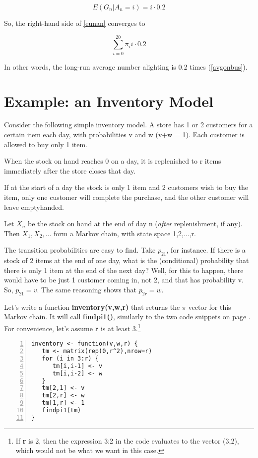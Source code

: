 \begin{equation}
E(G_n | A_n = i) = i \cdot 0.2
\end{equation}

So, the right-hand side of \ref{eunan} converges to

\begin{equation}
\sum_{i=0}^{20} \pi_i i \cdot 0.2
\end{equation}

In other words, the long-run average number alighting is 0.2 times
(\ref{avgonbus}).

\section{Example: an Inventory Model}

Consider the following simple inventory model.  A store
has 1 or 2 customers for a certain item each day, with probabilities v
and w (v+w = 1).  Each customer is allowed to buy only 1 item.

When the stock on hand reaches 0 on a day, it is replenished to r
items immediately after the store closes that day.

If at the start of a day the stock is only 1 item and 2 customers wish
to buy the item, only one customer will complete the purchase, and the
other customer will leave emptyhanded.

Let $X_n$ be the stock on hand at the end of day n ({\it after}
replenishment, if any).  Then $X_1, X_2,...$ form a Markov chain, with
state space 1,2,...,r.

The transition probabilities are easy to find.  Take $p_{21}$, for
instance.  If there is a stock of 2 items at the end of one day, what
is the (conditional) probability that there is only 1 item at the end of
the next day?  Well, for this to happen, there would have to be just 1
customer coming in, not 2, and that has probability v.  So, $p_{21} =
v$.  The same reasoning shows that $p_{2r} = w$.

Let's write a function {\bf inventory(v,w,r)} that returns the
$\pi$ vector for this Markov chain.  It will call {\bf findpi1()},
similarly to the two code snippets on page \pageref{codesnippets}.
For convenience, let's assume {\bf r} is at least 3.\footnote{If {\bf
r} is 2, then the expression 3:2 in the code evaluates to the vector
(3,2), which would not be what we want in this case.}

\begin{lstlisting}[numbers=left]
inventory <- function(v,w,r) {
   tm <- matrix(rep(0,r^2),nrow=r)
   for (i in 3:r) {
      tm[i,i-1] <- v
      tm[i,i-2] <- w
   }
   tm[2,1] <- v
   tm[2,r] <- w
   tm[1,r] <- 1
   findpi1(tm)
}
\end{lstlisting}

